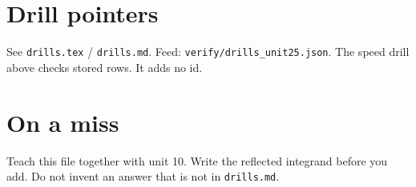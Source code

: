 \section{Drill pointers}
See \texttt{drills.tex} / \texttt{drills.md}. Feed: \texttt{verify/drills\_unit25.json}. The speed drill above checks stored rows. It adds no id.

\section*{On a miss}
Teach this file together with unit 10. Write the reflected integrand before you add. Do not invent an answer that is not in \texttt{drills.md}.

